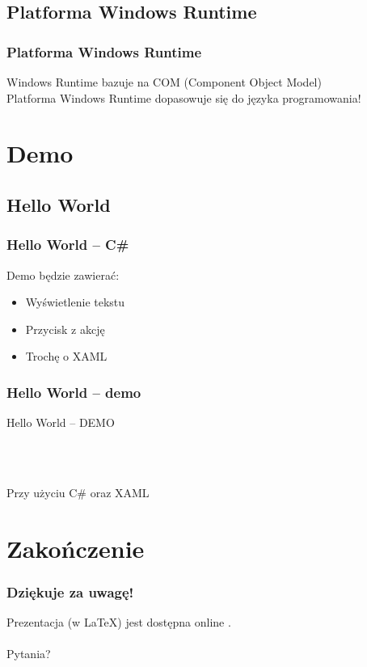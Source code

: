 \documentclass{beamer}
\begin{document}
\subsection{Platforma Windows Runtime}
\begin{frame}[fragile]
\frametitle{Platforma Windows Runtime}
Windows Runtime bazuje na COM (Component Object Model)
\\
Platforma Windows Runtime dopasowuje się do języka programowania!
\end{frame}


\section{Demo}
\subsection{Hello World}
\begin{frame}
\frametitle{Hello World -- C\#}
Demo będzie zawierać:
\begin{itemize}
\item Wyświetlenie tekstu
\item Przycisk z akcję
\item Trochę o XAML
\end{itemize}
\end{frame}


\begin{frame}
\frametitle{Hello World -- demo}

\begin{Huge}
Hello World -- DEMO
\end{Huge}
\\~\\
\begin{large}
Przy użyciu C\# oraz XAML
\end{large}

\end{frame}


\section{Zakończenie}
\begin{frame}
\frametitle{Dziękuje za uwagę!}
Prezentacja (w \LaTeX) jest dostępna online \href{http://github.com/soltys}{}. 
~\\
~\\
Pytania?

\end{frame}
\end{document}
